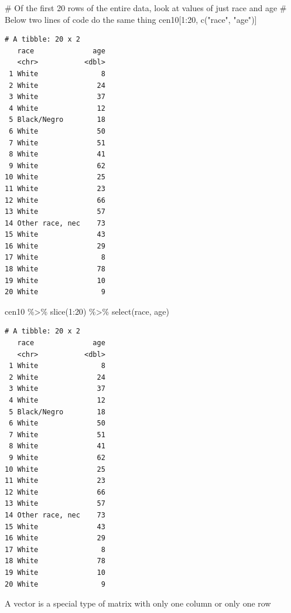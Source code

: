\documentclass[
  letterpaper,
]{book}
\newenvironment{Shaded}{\begin{snugshade}}{\end{snugshade}}
\newcommand{\CommentTok}[1]{\textcolor[rgb]{0.37,0.37,0.37}{#1}}
\newcommand{\DecValTok}[1]{\textcolor[rgb]{0.68,0.00,0.00}{#1}}
\newcommand{\FunctionTok}[1]{\textcolor[rgb]{0.28,0.35,0.67}{#1}}
\newcommand{\NormalTok}[1]{\textcolor[rgb]{0.00,0.23,0.31}{#1}}
\newcommand{\SpecialCharTok}[1]{\textcolor[rgb]{0.37,0.37,0.37}{#1}}
\newcommand{\StringTok}[1]{\textcolor[rgb]{0.13,0.47,0.30}{#1}}
\theoremstyle{definition}
\theoremstyle{definition}
\theoremstyle{plain}
\theoremstyle{definition}
\theoremstyle{plain}
\theoremstyle{plain}
\theoremstyle{remark}
\begin{document}
\begin{Shaded}
\begin{Highlighting}[]
\CommentTok{\# Of the first 20 rows of the entire data, look at values of just race and age}
\CommentTok{\# Below two lines of code do the same thing}
\NormalTok{cen10[}\DecValTok{1}\SpecialCharTok{:}\DecValTok{20}\NormalTok{, }\FunctionTok{c}\NormalTok{(}\StringTok{"race"}\NormalTok{, }\StringTok{"age"}\NormalTok{)]}
\end{Highlighting}
\end{Shaded}

\begin{verbatim}
# A tibble: 20 x 2
   race              age
   <chr>           <dbl>
 1 White               8
 2 White              24
 3 White              37
 4 White              12
 5 Black/Negro        18
 6 White              50
 7 White              51
 8 White              41
 9 White              62
10 White              25
11 White              23
12 White              66
13 White              57
14 Other race, nec    73
15 White              43
16 White              29
17 White               8
18 White              78
19 White              10
20 White               9
\end{verbatim}

\begin{Shaded}
\begin{Highlighting}[]
\NormalTok{cen10 }\SpecialCharTok{\%\textgreater{}\%} \FunctionTok{slice}\NormalTok{(}\DecValTok{1}\SpecialCharTok{:}\DecValTok{20}\NormalTok{) }\SpecialCharTok{\%\textgreater{}\%} \FunctionTok{select}\NormalTok{(race, age)}
\end{Highlighting}
\end{Shaded}

\begin{verbatim}
# A tibble: 20 x 2
   race              age
   <chr>           <dbl>
 1 White               8
 2 White              24
 3 White              37
 4 White              12
 5 Black/Negro        18
 6 White              50
 7 White              51
 8 White              41
 9 White              62
10 White              25
11 White              23
12 White              66
13 White              57
14 Other race, nec    73
15 White              43
16 White              29
17 White               8
18 White              78
19 White              10
20 White               9
\end{verbatim}

A vector is a special type of matrix with only one column or only one
row
\end{document}
